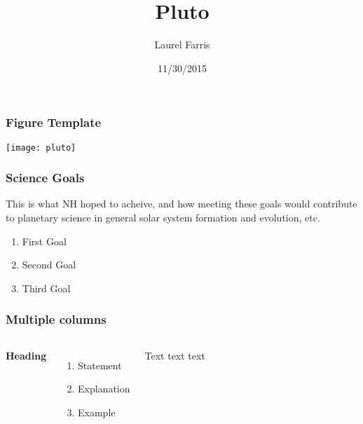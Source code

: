 \documentclass{beamer}
\title{Pluto}
\author{Laurel Farris}
\date{11/30/2015}
\begin{document}
\maketitle



\begin{frame}
    \frametitle{Figure Template}
    \texttt{[image: pluto]}





\end{frame}


\begin{frame}
    \frametitle{Science Goals}
    This is what NH hoped to acheive, and how meeting these goals
    would contribute to planetary science in general solar system
    formation and evolution, etc.
    \begin{enumerate}
    \item First Goal
    \item Second Goal
    \item Third Goal
    \end{enumerate}
\end{frame}


\begin{frame}
    \frametitle{Multiple columns}
    \begin{columns}[c] %
        \textbf{Heading}
        \begin{enumerate}
            \item Statement
            \item Explanation
            \item Example
        \end{enumerate}
            Text text text
        \end{columns}
\end{frame}
\end{document}
